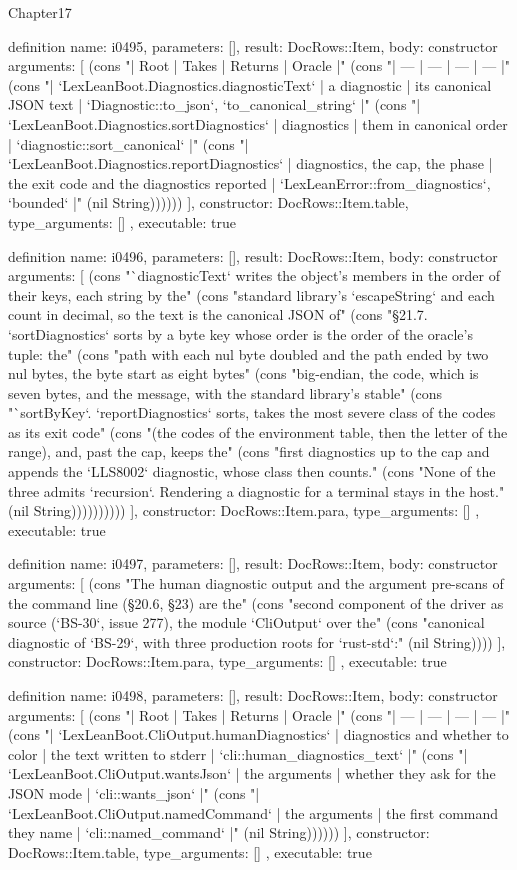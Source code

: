\begin{lexlean}{Chapter17}
\begin{semanticmodule}
definition{
  name: i0495,
  parameters: [],
  result: DocRows::Item,
  body: constructor{
    arguments: [
      (cons "| Root | Takes | Returns | Oracle |" (cons "| --- | --- | --- | --- |" (cons "| `LexLeanBoot.Diagnostics.diagnosticText` | a diagnostic | its canonical JSON text | `Diagnostic::to_json`, `to_canonical_string` |" (cons "| `LexLeanBoot.Diagnostics.sortDiagnostics` | diagnostics | them in canonical order | `diagnostic::sort_canonical` |" (cons "| `LexLeanBoot.Diagnostics.reportDiagnostics` | diagnostics, the cap, the phase | the exit code and the diagnostics reported | `LexLeanError::from_diagnostics`, `bounded` |" (nil String))))))
    ],
    constructor: DocRows::Item.table,
    type_arguments: []
  },
  executable: true
}

definition{
  name: i0496,
  parameters: [],
  result: DocRows::Item,
  body: constructor{
    arguments: [
      (cons "`diagnosticText` writes the object's members in the order of their keys, each string by the" (cons "standard library's `escapeString` and each count in decimal, so the text is the canonical JSON of" (cons "§21.7. `sortDiagnostics` sorts by a byte key whose order is the order of the oracle's tuple: the" (cons "path with each nul byte doubled and the path ended by two nul bytes, the byte start as eight bytes" (cons "big-endian, the code, which is seven bytes, and the message, with the standard library's stable" (cons "`sortByKey`. `reportDiagnostics` sorts, takes the most severe class of the codes as its exit code" (cons "(the codes of the environment table, then the letter of the range), and, past the cap, keeps the" (cons "first diagnostics up to the cap and appends the `LLS8002` diagnostic, whose class then counts." (cons "None of the three admits `recursion`. Rendering a diagnostic for a terminal stays in the host." (nil String))))))))))
    ],
    constructor: DocRows::Item.para,
    type_arguments: []
  },
  executable: true
}

definition{
  name: i0497,
  parameters: [],
  result: DocRows::Item,
  body: constructor{
    arguments: [
      (cons "The human diagnostic output and the argument pre-scans of the command line (§20.6, §23) are the" (cons "second component of the driver as source (`BS-30`, issue 277), the module `CliOutput` over the" (cons "canonical diagnostic of `BS-29`, with three production roots for `rust-std`:" (nil String))))
    ],
    constructor: DocRows::Item.para,
    type_arguments: []
  },
  executable: true
}

definition{
  name: i0498,
  parameters: [],
  result: DocRows::Item,
  body: constructor{
    arguments: [
      (cons "| Root | Takes | Returns | Oracle |" (cons "| --- | --- | --- | --- |" (cons "| `LexLeanBoot.CliOutput.humanDiagnostics` | diagnostics and whether to color | the text written to stderr | `cli::human_diagnostics_text` |" (cons "| `LexLeanBoot.CliOutput.wantsJson` | the arguments | whether they ask for the JSON mode | `cli::wants_json` |" (cons "| `LexLeanBoot.CliOutput.namedCommand` | the arguments | the first command they name | `cli::named_command` |" (nil String))))))
    ],
    constructor: DocRows::Item.table,
    type_arguments: []
  },
  executable: true
}


\end{semanticmodule}
\end{lexlean}
